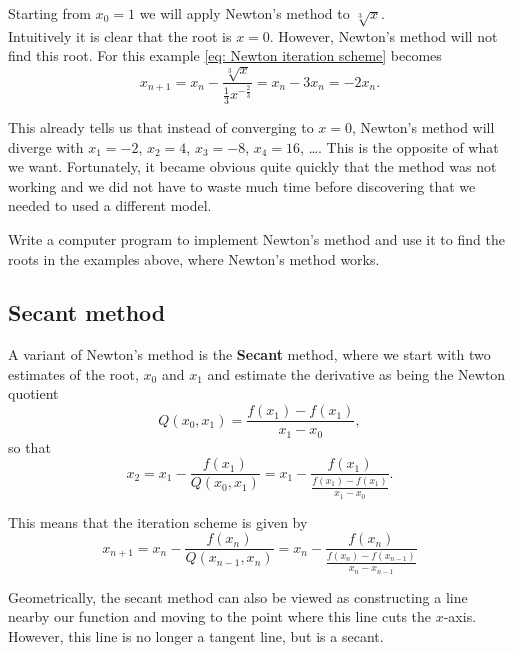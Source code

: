 \begin{ex}
Starting from $x_{0}=1$ we will apply Newton's method to $\sqrt[3]{x}$.\\

Intuitively it is clear that the root is $x=0$. However, Newton's method will not find this root. For this example \cref{eq: Newton iteration scheme} becomes
\begin{equation*}
x_{n+1}=x_{n}-\frac{\sqrt[3]{x}}{\frac{1}{3}x^{-\frac{2}{3}}}=x_{n}-3x_{n}=-2x_{n}.
\end{equation*}

This already tells us that instead of converging to $x=0$, Newton's method will diverge with $x_{1}=-2$, $x_{2}=4$, $x_{3}=-8$, $x_{4}=16$, \dots{}. This is the opposite of what we want. Fortunately, it became obvious quite quickly that the method was not working and we did not have to waste much time before discovering that we needed to used a different model.
\end{ex}

\begin{exercise}
Write a computer program to implement Newton's method and use it to find the roots in the examples above, where Newton's method works.
\end{exercise}

\subsection*{Secant method}
A variant of Newton's method is the \textbf{Secant} method, where we start with two estimates of the root, $x_{0}$ and $x_{1}$ and estimate the derivative as being the Newton quotient
\begin{equation*}
Q(x_{0},x_{1})=\frac{f(x_{1})-f(x_{1})}{x_{1}-x_{0}},
\end{equation*}
so that
\begin{equation*}
x_{2}=x_{1}-\frac{f(x_{1})}{Q(x_{0},x_{1})}=x_{1}-\frac{f(x_{1})}{\frac{f(x_{1})-f(x_{1})}{x_{1}-x_{0}}}.
\end{equation*}

This means that the iteration scheme is given by
\begin{equation}
x_{n+1}=x_{n}-\frac{f(x_{n})}{Q(x_{n-1},x_{n})}=x_{n}-\frac{f(x_{n})}{\frac{f(x_{n})-f(x_{n-1})}{x_{n}-x_{n-1}}}
\label{eq: secant method}
\end{equation}

Geometrically, the secant method can also be viewed as constructing a line nearby our function and moving to the point where this line cuts the $x$-axis. However, this line is no longer a tangent line, but is a secant. 

